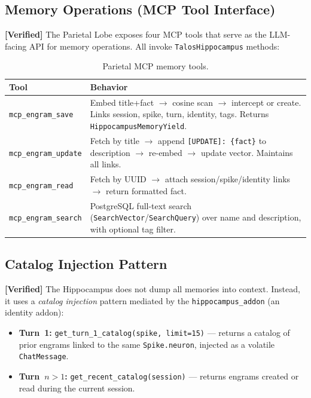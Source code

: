 \documentclass[11pt]{article}
\newcommand{\verified}{\textcolor{verifiedgreen}{\textbf{[Verified]}}}
\theoremstyle{definition}
\theoremstyle{remark}
\begin{document}
\subsection{Memory Operations (MCP Tool Interface)}

\verified{} The Parietal Lobe exposes four MCP tools that serve as the
LLM-facing API for memory operations. All invoke
\texttt{TalosHippocampus} methods:

\begin{table}[h]
\centering
\begin{tabular}{@{}lp{8cm}@{}}
\toprule
\textbf{Tool} & \textbf{Behavior} \\
\midrule
\texttt{mcp\_engram\_save} &
  Embed title+fact $\to$ cosine scan $\to$ intercept or create. Links
  session, spike, turn, identity, tags. Returns
  \texttt{HippocampusMemoryYield}. \\[0.5em]
\texttt{mcp\_engram\_update} &
  Fetch by title $\to$ append \texttt{[UPDATE]: \{fact\}} to description
  $\to$ re-embed $\to$ update vector. Maintains all links. \\[0.5em]
\texttt{mcp\_engram\_read} &
  Fetch by UUID $\to$ attach session/spike/identity links $\to$ return
  formatted fact. \\[0.5em]
\texttt{mcp\_engram\_search} &
  PostgreSQL full-text search (\texttt{SearchVector}/\texttt{SearchQuery})
  over name and description, with optional tag filter. \\
\bottomrule
\end{tabular}
\caption{Parietal MCP memory tools.}
\label{tab:mcp-tools}
\end{table}

\subsection{Catalog Injection Pattern}

\verified{} The Hippocampus does not dump all memories into context. Instead,
it uses a \emph{catalog injection} pattern mediated by the
\texttt{hippocampus\_addon} (an identity addon):

\begin{itemize}[nosep]
  \item \textbf{Turn~1:} \texttt{get\_turn\_1\_catalog(spike, limit=15)} ---
    returns a catalog of prior engrams linked to the same
    \texttt{Spike.neuron}, injected as a volatile \texttt{ChatMessage}.
  \item \textbf{Turn~$n > 1$:} \texttt{get\_recent\_catalog(session)} ---
    returns engrams created or read during the current session.
\end{itemize}
\end{document}
